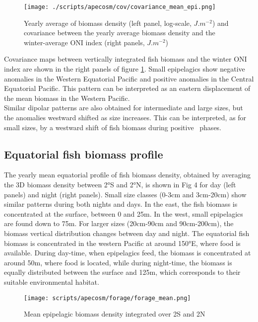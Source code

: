 \begin{figure}[h!]
    \centering
    \texttt{[image: ./scripts/apecosm/cov/covariance\_mean\_epi.png]}
    \caption{Yearly average of biomass density (left panel, log-scale, $J.m^{-2}$) and 
    covariance between the yearly average biomass density and the winter-average ONI index (right panels, $J.m^{-2}$)}
    \label{fig:mean-cov-ape}
\end{figure}

Covariance maps between vertically integrated fish biomass and the winter ONI index are shown in the right panels of figure \ref{fig:mean-cov-ape}. 
Small epipelagics show negative anomalies in the Western Equatorial Pacific and positive anomalies in the Central Equatorial Pacific. This pattern can be interpreted as an eastern displacement of the mean biomass in the Western Pacific.\\

Similar dipolar patterns are also obtained for intermediate and large sizes, but the anomalies westward shifted as size increases. This can be interpreted, as for small sizes, by a westward shift of fish biomass during positive \nino\ phases.\\

\subsection{Equatorial fish biomass profile}

The yearly mean equatorial profile of fish biomass density, obtained by averaging the 3D biomass density between 2°S and 2°N, is shown in Fig 4 for day (left panels) and night (right panels). Small size classes (0-3cm and 3cm-20cm) show similar patterns during both nights and days. In the east, the fish biomass is concentrated at the surface, between 0 and 25m. In the west, small epipelagics are found down to 75m. For larger sizes (20cm-90cm and 90cm-200cm), the biomass vertical distribution changes between day and night. The equatorial fish biomass is concentrated in the western Pacific at around 150°E, where food is available. During day-time, when epipelagics feed, the biomass is concentrated at around 50m, where food is located, while during night-time, the biomass is equally distributed between the surface and 125m, which corresponds to their suitable environmental habitat.\\

\begin{figure}[h!]
    \centering	
    \texttt{[image: scripts/apecosm/forage/forage\_mean.png]}
	\caption{Mean epipelagic biomass density integrated over 2\degree S and 2\degree N}
    \label{fig:mean-forage}
\end{figure}

